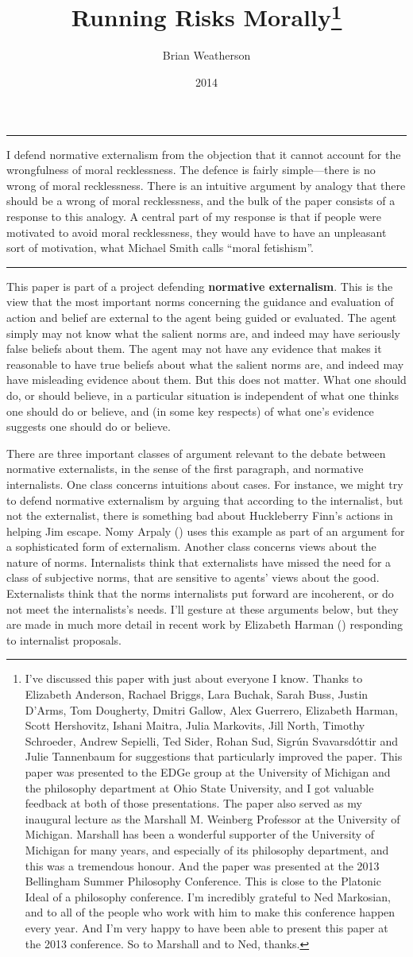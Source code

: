 \documentclass[
  10pt,
  letterpaper,
  DIV=11,
  numbers=noendperiod,
  twoside]{scrartcl}
\title{Running Risks Morally\thanks{I've discussed this paper with just
about everyone I know. Thanks to Elizabeth Anderson, Rachael Briggs,
Lara Buchak, Sarah Buss, Justin D'Arms, Tom Dougherty, Dmitri Gallow,
Alex Guerrero, Elizabeth Harman, Scott Hershovitz, Ishani Maitra, Julia
Markovits, Jill North, Timothy Schroeder, Andrew Sepielli, Ted Sider,
Rohan Sud, Sigrún Svavarsdóttir and Julie Tannenbaum for suggestions
that particularly improved the paper. This paper was presented to the
EDGe group at the University of Michigan and the philosophy department
at Ohio State University, and I got valuable feedback at both of those
presentations. The paper also served as my inaugural lecture as the
Marshall M. Weinberg Professor at the University of Michigan. Marshall
has been a wonderful supporter of the University of Michigan for many
years, and especially of its philosophy department, and this was a
tremendous honour. And the paper was presented at the 2013 Bellingham
Summer Philosophy Conference. This is close to the Platonic Ideal of a
philosophy conference. I'm incredibly grateful to Ned Markosian, and to
all of the people who work with him to make this conference happen every
year. And I'm very happy to have been able to present this paper at the
2013 conference. So to Marshall and to Ned, thanks.}}
\author{Brian Weatherson}
\date{2014}
\renewenvironment{abstract}
 {\vspace{-1.25cm}
 \quotation\small\noindent\rule{\linewidth}{.5pt}\par\smallskip
 \noindent }
 {\par\noindent\rule{\linewidth}{.5pt}\endquotation}
\begin{document}
\maketitle
\begin{abstract}
I defend normative externalism from the objection that it cannot account
for the wrongfulness of moral recklessness. The defence is fairly
simple---there is no wrong of moral recklessness. There is an intuitive
argument by analogy that there should be a wrong of moral recklessness,
and the bulk of the paper consists of a response to this analogy. A
central part of my response is that if people were motivated to avoid
moral recklessness, they would have to have an unpleasant sort of
motivation, what Michael Smith calls ``moral fetishism''.
\end{abstract}


This paper is part of a project defending \textbf{normative
externalism}. This is the view that the most important norms concerning
the guidance and evaluation of action and belief are external to the
agent being guided or evaluated. The agent simply may not know what the
salient norms are, and indeed may have seriously false beliefs about
them. The agent may not have any evidence that makes it reasonable to
have true beliefs about what the salient norms are, and indeed may have
misleading evidence about them. But this does not matter. What one
should do, or should believe, in a particular situation is independent
of what one thinks one should do or believe, and (in some key respects)
of what one's evidence suggests one should do or believe.

There are three important classes of argument relevant to the debate
between normative externalists, in the sense of the first paragraph, and
normative internalists. One class concerns intuitions about cases. For
instance, we might try to defend normative externalism by arguing that
according to the internalist, but not the externalist, there is
something bad about Huckleberry Finn's actions in helping Jim escape.
Nomy Arpaly () uses this example as part
of an argument for a sophisticated form of externalism. Another class
concerns views about the nature of norms. Internalists think that
externalists have missed the need for a class of subjective norms, that
are sensitive to agents' views about the good. Externalists think that
the norms internalists put forward are incoherent, or do not meet the
internalists's needs. I'll gesture at these arguments below, but they
are made in much more detail in recent work by Elizabeth Harman
() responding to internalist proposals.
\end{document}
